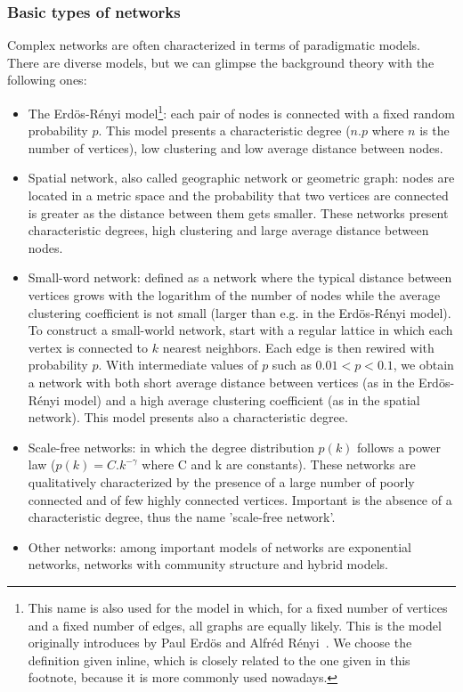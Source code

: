 \subsubsection{Basic types of networks}
Complex networks are often characterized in terms of paradigmatic models.
There are diverse models, but we can glimpse the background theory
with the following ones:
\begin{itemize}
	\item The Erdös-Rényi model\footnote{This name is also used for the model in which, for a fixed number of vertices and a fixed number of edges, all graphs are equally likely. This is the model originally introduces by Paul Erdös and Alfréd Rényi~\cite{erdosOrig}.
		We choose the definition given inline, which is closely related to the one given in this footnote, because it is more commonly used nowadays.}: each pair of nodes is connected with a fixed random probability $p$.
		This model presents a characteristic degree ($n.p$ where $n$ is the number of vertices), low clustering and low average distance between nodes.
	\item Spatial network, also called geographic network or geometric graph: nodes are located in a metric space and the probability that two vertices are connected is greater as the distance between them gets smaller. These networks present characteristic degrees, high clustering and large average distance between nodes.
	\item Small-word network: defined as a network where the typical distance between vertices grows with the logarithm of the number of nodes while the average clustering coefficient is not small (larger than e.g. in the Erdös-Rényi model).
		To construct a small-world network, start with a regular lattice in which each vertex is connected to $k$ nearest neighbors.
		Each edge is then rewired with probability $p$.
		With intermediate values of $p$ such as $0.01<p<0.1$, we obtain a network with both short average distance between vertices (as in the Erdös-Rényi model) and a high average clustering coefficient (as in the spatial network).
		This model presents also a characteristic degree.
	\item Scale-free networks: in which the degree distribution $p(k)$ follows a power law ($p(k)=C.k^{-\gamma}$ where C and k are constants).
		These networks are qualitatively characterized by the presence of a large number of poorly connected and of few highly connected vertices.
		Important is the absence of a characteristic degree, thus the name 'scale-free network'.
	\item Other networks: among important models of networks are exponential networks, networks with community structure and hybrid models.
\end{itemize}
